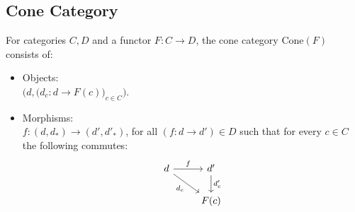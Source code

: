 \subsection{Cone Category}
\begin{definition}
  For categories $C, D$ and a functor $F:C\to D$, the cone category
  $\mathrm{Cone}(F)$ consists of: \parencite{fong_spivak:7sketches}

  \begin{itemize}
    \item Objects:\\
      $\big(d, \big(d_c: d \to F(c)\big)_{c\in C}\big)$.
    \item Morphisms:\\
      $f: (d, d_*) \to (d', d'_*)$, for all $(f:d\to d')\in D$ such
      that for every $c\in C$ the following commutes:
      \[\begin{tikzcd}
        d & {d'} \\
        & {F(c)}
        \arrow["{d_c}"', from=1-1, to=2-2]
        \arrow["{d'_c}", from=1-2, to=2-2]
        \arrow["f", from=1-1, to=1-2]
      \end{tikzcd}\]
  \end{itemize}
\end{definition}
